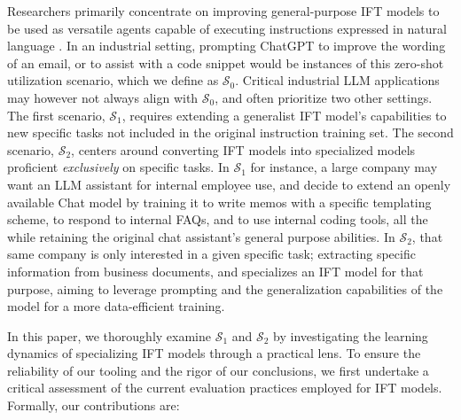 Researchers primarily concentrate on improving general-purpose IFT models to be used as versatile agents capable of executing instructions expressed in natural language . 
In an industrial setting, prompting ChatGPT to improve the wording of an email, or to assist with a code snippet would be instances of this zero-shot utilization scenario, which we define as $\mathcal{S}_0$. 
Critical industrial LLM applications may however not always align with $\mathcal{S}_0$, and often prioritize two other settings. The first scenario, $\mathcal{S}_1$, requires extending a generalist IFT model's capabilities to new specific tasks not included in the original instruction training set. The second scenario, $\mathcal{S}_2$, centers around converting IFT models into specialized models proficient \emph{exclusively} on specific tasks.  
%
In $\mathcal{S}_1$ for instance, a large company may want an LLM assistant for internal employee use, and decide to extend an openly available Chat model by training it to write memos with a specific templating scheme, to respond to internal FAQs, and to use internal coding tools, all the while retaining the original chat assistant's general purpose abilities. In $\mathcal{S}_2$, that same company is only interested in a given specific task; extracting specific information from business documents, and specializes an IFT model for that purpose, aiming to leverage prompting and the generalization capabilities of the model for a more data-efficient training.

In this paper, we thoroughly examine $\mathcal{S}_1$ and $\mathcal{S}_2$ by investigating the learning dynamics of specializing IFT models through a practical lens. To ensure the reliability of our tooling and the rigor of our conclusions, we first undertake a critical assessment of the current evaluation practices employed for IFT models. Formally, our contributions are:

